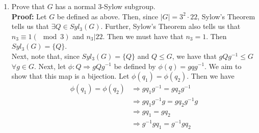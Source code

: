 \documentclass{article}
\begin{document}
\begin{enumerate}
\begin{enumerate}
        of $P$ in $G$.\\
        \textbf{Proof:} Let $P \in Syl_{11}(G)$ with $n_{11}=1$, and let $C_G(P) = \{c \in G: cp=pc \ \forall p \in P\}$ be the centralizer 
        of $P$ in $G$. Note that, since $n_{11}=1$, we must have that $P \trianglelefteq G$. Then we need to show that $gC_G(P)g^{-1} = 
        C_G(P) \ \forall g \in G$. That is, we need to show that $gcg^{-1} \in C_G(P), \ c \in C_G(P) \ \forall g \in G$. Let $p \in P$. We 
        have 
        \begin{align*}
            p(gcg^{-1}) &= gg^{-1}p(gcg^{-1}) \\
            &= g(g^{-1}p)gcg^{-1} \\
            &= g(p_1g^{-1}g)cg^{-1} \text{ since } P \trianglelefteq G\\
            &= gp_1cg^{-1} \\
            &= gcp_1g^{-1} \\
            &= (gcg^{-1})p \text{ since we established } p_1g^{-1} = g^{-1}p\\
            &\Longrightarrow gcg^{-1} \in C_G(P) \\
            &\Longrightarrow gC_G(P)g^{-1}=C_G(P) \\
            &\Longrightarrow C_G(P) \trianglelefteq G. \ \square
        \end{align*}
        \item Prove that $G$ has a normal $3$-Sylow subgroup.\\
        \textbf{Proof:} Let $G$ be defined as above. Then, since $|G| = 3^2 \cdot 22$, Sylow's Theorem tells us that $\exists Q \in 
        Syl_3(G)$. Further, Sylow's Theorem also tells us that $n_3 \equiv 1(\mod{3})$ and $n_3 \big| 22$. Then we must have that $n_3 =1$. 
        Then $Syl_3(G) = \{Q\}$.\\
        Next, note that, since $Syl_3(G) = \{Q\}$ and $Q \leq G$, we have that $gQg^{-1} \leq G$ $\forall g \in G$. Next, let $\phi:Q 
        \Longrightarrow gQg^{-1}$ be defined by $\phi(q)=gqg^{-1}$. We aim to show that this map is a bijection. Let $\phi(q_1)=\phi(q_2)$. 
        Then we have
        \begin{align*}
            \phi(q_1)=\phi(q_2) &\Longrightarrow gq_1g^{-1} = gq_2g^{-1} \\
            &\Longrightarrow gq_1g^{-1}g = gq_2g^{-1}g \\
            &\Longrightarrow gq_1=gq_2 \\
            &\Longrightarrow g^{-1}gq_1 = g^{-1}gq_2 \\

\end{align*}
\end{enumerate}
\end{enumerate}
\end{document}
